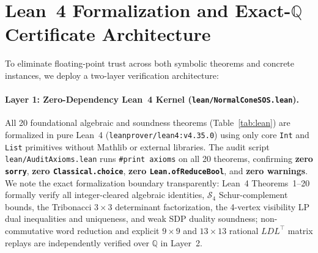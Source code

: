 \documentclass[11pt,a4paper]{article}
\newcommand{\QQ}{\mathbb{Q}}
\newcommand{\calS}{\mathcal{S}}
\begin{document}
\section{Lean~4 Formalization and \texorpdfstring{Exact-$\QQ$}{Exact-Q} Certificate Architecture}
\label{sec:formal}

To eliminate floating-point trust across both symbolic theorems and concrete instances, we deploy a two-layer verification architecture:

\paragraph{Layer 1: Zero-Dependency Lean~4 Kernel (\texttt{lean/NormalConeSOS.lean}).}
All 20 foundational algebraic and soundness theorems (Table~\ref{tab:lean}) are formalized in pure Lean~4 (\texttt{leanprover/\allowbreak lean4:v4.35.0}) using only core \texttt{Int} and \texttt{List} primitives without Mathlib or external libraries.
The audit script \texttt{lean/AuditAxioms.lean} runs \texttt{\#print axioms} on all 20 theorems, confirming \textbf{zero \texttt{sorry}}, \textbf{zero \texttt{Classical.choice}}, \textbf{zero \texttt{Lean.ofReduceBool}}, and \textbf{zero warnings}.
We note the exact formalization boundary transparently: Lean~4 Theorems~1--20 formally verify all integer-cleared algebraic identities, $\calS_4$ Schur-complement bounds, the Tribonacci $3\times 3$ determinant factorization, the 4-vertex visibility LP dual inequalities and uniqueness, and weak SDP duality soundness; non-commutative word reduction and explicit $9\times 9$ and $13\times 13$ rational $LDL^\top$ matrix replays are independently verified over $\QQ$ in Layer~2.
\end{document}
